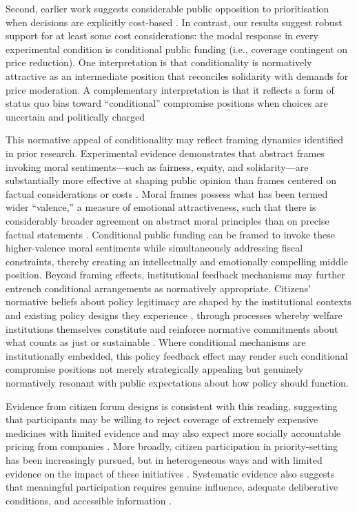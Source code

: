 \documentclass[11pt]{article}\usepackage[]{graphicx}\usepackage[]{xcolor}
\begin{document}
Second, earlier work suggests considerable public opposition to prioritisation when decisions are explicitly cost-based \parencite{Blendon2012}. In contrast, our results suggest robust support for at least some cost considerations: the modal response in every experimental condition is conditional public funding (i.e., coverage contingent on price reduction). One interpretation is that conditionality is normatively attractive as an intermediate position that reconciles solidarity with demands for price moderation. A complementary interpretation is that it reflects a form of status quo bias toward ``conditional'' compromise positions when choices are uncertain and politically charged \parencite{SamuelsonZeckhauser1988StatusQuoBias} 

This normative appeal of conditionality may reflect framing dynamics identified in prior research. Experimental evidence demonstrates that abstract frames invoking moral sentiments---such as fairness, equity, and solidarity---are substantially more effective at shaping public opinion than frames centered on factual considerations or costs \parencite{Kangas2014}. Moral frames possess what has been termed wider ``valence,'' a measure of emotional attractiveness, such that there is considerably broader agreement on abstract moral principles than on precise factual statements \parencite{Cox2013}. Conditional public funding can be framed to invoke these higher-valence moral sentiments while simultaneously addressing fiscal constraints, thereby creating an intellectually and emotionally compelling middle position. Beyond framing effects, institutional feedback mechanisms may further entrench conditional arrangements as normatively appropriate. Citizens' normative beliefs about policy legitimacy are shaped by the institutional contexts and existing policy designs they experience \parencite{Lindh2015}, through processes whereby welfare institutions themselves constitute and reinforce normative commitments about what counts as just or sustainable \parencite{Svallfors1997}. Where conditional mechanisms are institutionally embedded, this policy feedback effect may render such conditional compromise positions not merely strategically appealing but genuinely normatively resonant with public expectations about how policy should function.


Evidence from citizen forum designs is consistent with this reading, suggesting that participants may be willing to reject coverage of extremely expensive medicines with limited evidence and may also expect more socially accountable pricing from companies \parencite{Bijlmakers2020CitizenForum}. More broadly, citizen participation in priority-setting has been increasingly pursued, but in heterogeneous ways and with limited evidence on the impact of these initiatives \parencite{Mitton2009ScopingReview, Manafo2018RapidReview, Razavi2020VulnerableParticipation, Oortwijn2021EDPPartII}. Systematic evidence also suggests that meaningful participation requires genuine influence, adequate deliberative conditions, and accessible information \parencite{ArthurSahaKapilashrami2023}.
\end{document}
